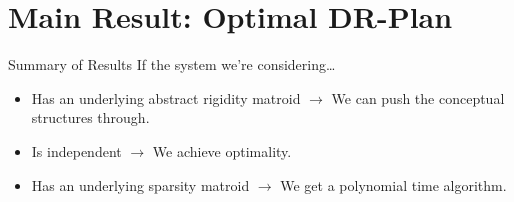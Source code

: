 \documentclass{mySlides}
\newcommand{\n}{\vspace{1em}}
\begin{document}
\section{Main Result: Optimal DR-Plan}
\begin{frame}{Summary of Results}
    If the system we're considering\ldots
    \begin{itemize}[<+->]
        \item Has an underlying abstract rigidity matroid $\to$ We can push the conceptual structures through.
        \item Is independent $\to$ We achieve optimality.
        \item Has an underlying sparsity matroid $\to$ We get a polynomial time algorithm.
    \end{itemize}

    \n

\end{frame}
\end{document}
